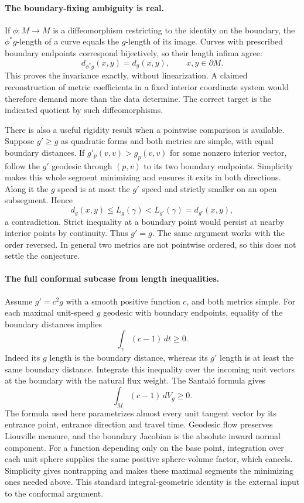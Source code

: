 \documentclass[11pt]{article}
\begin{document}
\paragraph{The boundary-fixing ambiguity is real.}
If $\phi:M\to M$ is a diffeomorphism restricting to the identity on
the boundary, the $\phi^*g$-length of a curve equals the $g$-length
of its image. Curves with prescribed boundary endpoints correspond
bijectively, so their length infima agree:
\[
 d_{\phi^*g}(x,y)=d_g(x,y),\qquad x,y\in\partial M.
\]
This proves the invariance exactly, without linearization. A claimed
reconstruction of metric coefficients in a fixed interior coordinate
system would therefore demand more than the data determine.
The correct target is the indicated quotient by such diffeomorphisms.

There is also a useful rigidity result when a pointwise comparison is
available. Suppose $g'\ge g$ as quadratic forms and both metrics are
simple, with equal boundary distances. If $g'_p(v,v)>g_p(v,v)$ for
some nonzero interior vector, follow the $g'$ geodesic through $(p,v)$
to its two boundary endpoints. Simplicity makes this whole segment
minimizing and ensures it exits in both directions. Along it the
$g$ speed is at most the $g'$ speed and strictly smaller on an open
subsegment. Hence
\[
 d_g(x,y)\le L_g(\gamma)<L_{g'}(\gamma)=d_{g'}(x,y),
\]
a contradiction. Strict inequality at a boundary point would persist
at nearby interior points by continuity. Thus $g'=g$. The same argument
works with the order reversed. In general two metrics are not pointwise
ordered, so this does not settle the conjecture.

\paragraph{The full conformal subcase from length inequalities.}
Assume $g'=c^2g$ with a smooth positive function $c$, and both metrics
simple. For each maximal unit-speed $g$ geodesic with boundary endpoints,
equality of the boundary distances implies
\[
                  \int_\gamma(c-1)\,dt\ge0.
\]
Indeed its $g$ length is the boundary distance, whereas its $g'$ length
is at least the same boundary distance. Integrate this inequality over
the incoming unit vectors at the boundary with the natural flux weight.
The Santal\'o formula gives
\begin{equation}\label{a275:conformal1}
                        \int_M(c-1)\,dV_g\ge0.
\end{equation}
The formula used here parametrizes almost every unit tangent vector by
its entrance point, entrance direction and travel time. Geodesic flow
preserves Liouville measure, and the boundary Jacobian is the absolute
inward normal component. For a function depending only on the base
point, integration over each unit sphere supplies the same positive
sphere-volume factor, which cancels. Simplicity gives nontrapping and
makes these maximal segments the minimizing ones needed above. This
standard integral-geometric identity is the external input to the
conformal argument.
\end{document}
